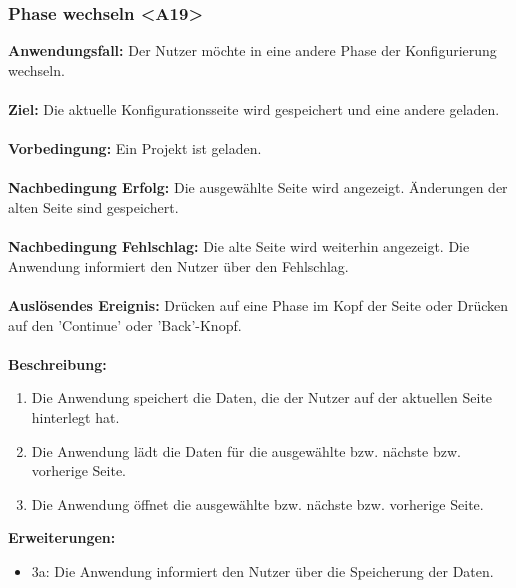 \documentclass[parskip=full]{scrartcl} %
\begin{document}
\subsubsection*{Phase wechseln <A19>}
\textbf{Anwendungsfall:} Der Nutzer möchte in eine andere Phase der Konfigurierung wechseln.\\\\
\textbf{Ziel:} Die aktuelle Konfigurationsseite wird gespeichert und eine andere geladen. \\\\
\textbf{Vorbedingung:} Ein Projekt ist geladen. \\\\
\textbf{Nachbedingung Erfolg:} Die ausgewählte Seite wird angezeigt. Änderungen der alten Seite sind gespeichert.\\\\
\textbf{Nachbedingung Fehlschlag:} Die alte Seite wird weiterhin angezeigt. Die Anwendung informiert den Nutzer über den Fehlschlag. \\\\
\textbf{Auslösendes Ereignis:} Drücken auf eine Phase im Kopf der Seite oder Drücken auf den 'Continue' oder 'Back'-Knopf. \\\\
\textbf{Beschreibung:}
\begin{enumerate}
    \item Die Anwendung speichert die Daten, die der Nutzer auf der aktuellen Seite hinterlegt hat.
    \item Die Anwendung lädt die Daten für die ausgewählte bzw. nächste bzw. vorherige Seite.
    \item Die Anwendung öffnet die ausgewählte bzw. nächste bzw. vorherige Seite.
\end{enumerate}
\textbf{Erweiterungen:} 
\begin{itemize}
    \item 3a: Die Anwendung informiert den Nutzer über die Speicherung der Daten.
\end{itemize}
\newpage
\end{document}
